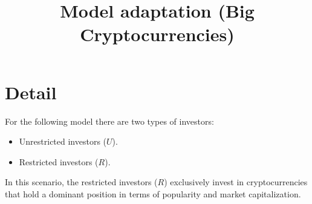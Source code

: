 \documentclass{article}
\title{\textbf{Model adaptation (Big  Cryptocurrencies)}}
\date{}
\begin{document}
\maketitle
\thispagestyle{fancy}
\vspace{-2cm}
\section{Detail}
For the following model there are two types of investors:
\begin{itemize}
	\item Unrestricted investors ($U$).
	\item Restricted investors ($R$).
\end{itemize}
In this scenario, the restricted investors ($R$) exclusively invest in cryptocurrencies that hold a dominant position in terms of popularity and market capitalization.\\
\end{document}
